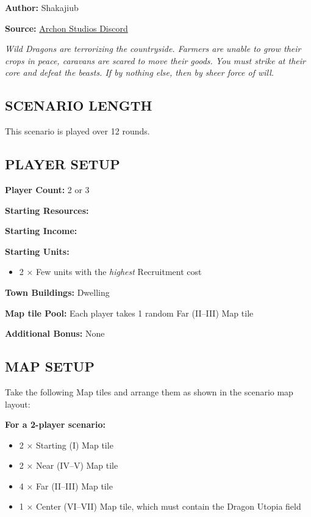 
\begin{multicols*}{2}

\textbf{Author:} Shakajiub

\textbf{Source:} \href{https://discord.com/channels/740870068178649108/1237891632448278618}{Archon Studios Discord}

\textit{Wild Dragons are terrorizing the countryside.
Farmers are unable to grow their crops in peace, caravans are scared to move their goods.
You must strike at their core and defeat the beasts.
If by nothing else, then by sheer force of will.}

\subsection*{\MakeUppercase{Scenario Length}}
This scenario is played over 12 rounds.

\subsection*{\MakeUppercase{Player Setup}}
\textbf{Player Count:} 2 or 3

\textbf{Starting Resources:}\par
{}

\textbf{Starting Income:}\par
{}

\textbf{Starting Units:}
\begin{itemize}
  \item 2 × Few  units with the \textit{highest} Recruitment cost
\end{itemize}

\textbf{Town Buildings:}  Dwelling

\textbf{Map tile Pool:} Each player takes 1 random Far (II--III) Map tile

\textbf{Additional Bonus:} None

\subsection*{\MakeUppercase{Map Setup}}
Take the following Map tiles and arrange them as shown in the scenario map layout:

\textbf{For a 2-player scenario:}
\begin{itemize}
  \item 2 × Starting (I) Map tile
  \item 2 × Near (IV--V) Map tile
  \item 4 × Far (II--III) Map tile
  \item 1 × Center (VI--VII) Map tile, which must contain the Dragon Utopia field
\end{itemize}


\end{multicols*}
